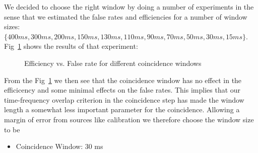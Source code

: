 \documentclass{article}
\begin{document}
We decided to choose the right window by doing a number of experiments
in the sense that we estimated the false rates and efficiencies
for a number of window sizes: $\{400 ms, 300ms, 200ms, 150 ms, 130ms,
110ms, 90ms, 70ms, 50ms, 30ms, 15ms\} $.  Fig~\ref{fig:tuneburcawindow}
shows the results of that experiment:   
\begin{figure}
\begin{center}
\caption{Efficiency vs. False rate for different coincidence windows}
\label{fig:tuneburcawindow}
\end{center}
\end{figure} 
From the Fig~\ref{fig:tuneburcawindow} we then see that the coincidence
window has no effect in the efficicency and some minimal effects on
the false rates. This implies that our time-frequency overlap criterion
in the coincidence step has made the window length a somewhat less 
important parameter for the coincidence. Allowing a margin of error 
from sources like calibration we therefore choose the window size to be
\begin{itemize}
\item Coincidence Window: 30 ms
\end{itemize}
\end{document}
